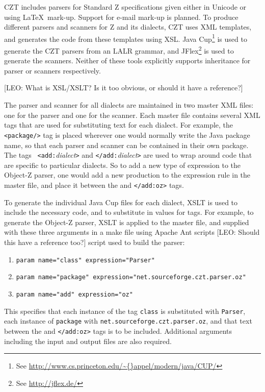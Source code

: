 \documentclass{llncs}
\begin{document}
  CZT includes parsers for Standard Z specifications given either in
  Unicode or using \LaTeX\ mark-up.  Support for e-mail mark-up is
  planned. To produce different parsers and scanners for Z and its
  dialects, CZT uses XML templates, and generates the code from these
  templates using XSL. Java Cup\footnote{See
  \url{http://www.cs.princeton.edu/\~{}appel/modern/java/CUP/}} is
  used to generate the CZT parsers from an LALR grammar, and
  JFlex\footnote{See \url{http://jflex.de/}} is used to generate the
  scanners. Neither of these tools explicitly supports inheritance for
  parser or scanners respectively.

  [LEO: What is XSL/XSLT? Is it too obvious, or should it have a reference?]

The parser and scanner for all dialects are maintained in two master
XML files: one for the parser and one for the scanner. Each master
file contains several XML tags that are used for substituting text for
each dialect. For example, the {\tt <package/>} tag is placed wherever
one would normally write the Java package name, so that each parser
and scanner can be contained in their own package. The tags {\tt
<add:}{\em dialect}{\tt >} and {\tt </add:}{\em dialect}{\tt >} are
used to wrap around code that are specific to particular dialects. So
to add a new type of expression to the Object-Z parser, one would add
a new production to the expression rule in the master file, and place
it between the {\tt <add:oz>} and {\tt </add:oz>} tags.

To generate the individual Java Cup files for each dialect, XSLT is
used to include the necessary code, and to substitute in values for
tags. For example, to generate the Object-Z parser, XSLT is applied to
the master file, and supplied with these three arguments in a make file
using Apache Ant scripts [LEO: Should this have a reference too?]
script used to build the parser:
\begin{enumerate}
  \item {\tt param name="class" expression="Parser"}
  \item {\tt param name="package" expression="net.sourceforge.czt.parser.oz"}
  \item {\tt param name="add" expression="{oz}"}
\end{enumerate}

This specifies that each instance of the tag {\tt class} is
substituted with {\tt Parser}, each instance of {\tt package} with
{\tt net.sourceforge.czt.parser.oz}, and that text between the
{\tt <add:oz>} and {\tt </add:oz>} tags is to be included. Additional
arguments including the input and output files are also required.
\end{document}
